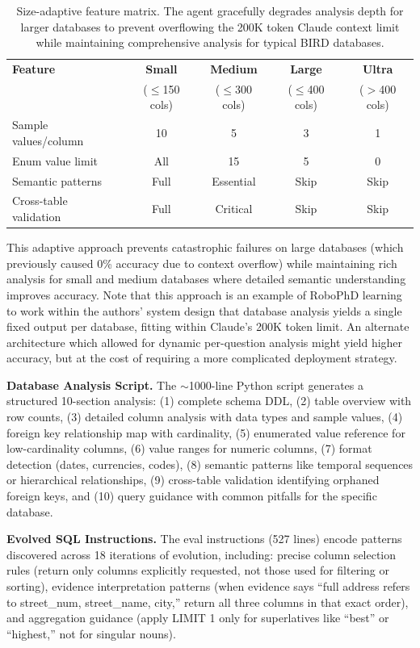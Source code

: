 \documentclass{article}
\begin{document}
\begin{table}[h]
\centering
\small
\begin{tabular}{lcccc}
\toprule
\textbf{Feature} & \textbf{Small} & \textbf{Medium} & \textbf{Large} & \textbf{Ultra} \\
& ($\leq$150 cols) & ($\leq$300 cols) & ($\leq$400 cols) & ($>$400 cols) \\
\midrule
Sample values/column & 10 & 5 & 3 & 1 \\
Enum value limit & All & 15 & 5 & 0 \\
Semantic patterns & Full & Essential & Skip & Skip \\
Cross-table validation & Full & Critical & Skip & Skip \\
\bottomrule
\end{tabular}
\caption{Size-adaptive feature matrix. The agent gracefully degrades analysis depth for larger databases to prevent overflowing the 200K token Claude context limit while maintaining comprehensive analysis for typical BIRD databases.}
\label{tab:size-adaptive}
\end{table}

This adaptive approach prevents catastrophic failures on large databases (which previously caused 0\% accuracy due to context overflow) while maintaining rich analysis for small and medium databases where detailed semantic understanding improves accuracy.  Note that this approach is an example of RoboPhD learning to work within the authors' system design that database analysis yields a single fixed output per database, fitting within Claude's 200K token limit.  An alternate architecture which allowed for dynamic per-question analysis might yield higher accuracy, but at the cost of requiring a more complicated deployment strategy. 

\textbf{Database Analysis Script.} The $\sim$1000-line Python script generates a structured 10-section analysis: (1) complete schema DDL, (2) table overview with row counts, (3) detailed column analysis with data types and sample values, (4) foreign key relationship map with cardinality, (5) enumerated value reference for low-cardinality columns, (6) value ranges for numeric columns, (7) format detection (dates, currencies, codes), (8) semantic patterns like temporal sequences or hierarchical relationships, (9) cross-table validation identifying orphaned foreign keys, and (10) query guidance with common pitfalls for the specific database.

\textbf{Evolved SQL Instructions.} The eval instructions (527 lines) encode patterns discovered across 18 iterations of evolution, including: precise column selection rules (return only columns explicitly requested, not those used for filtering or sorting), evidence interpretation patterns (when evidence says ``full address refers to street\_num, street\_name, city,'' return all three columns in that exact order), and aggregation guidance (apply LIMIT 1 only for superlatives like ``best'' or ``highest,'' not for singular nouns).
\end{document}
